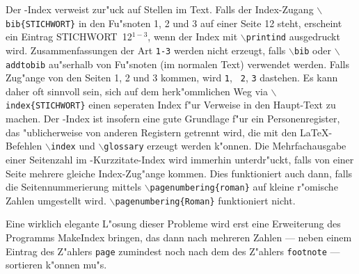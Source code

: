 \documentclass[11pt]{article}                    %
\def\Befehl#1{{\tt$\backslash$#1}}
\begin{document}
  Der \bibarts-Index verweist zur"uck auf Stellen im Text. Falls der
  Index-Zugang \Befehl{bib\{STICHWORT\}} in den Fu"snoten 1, 2 und 3 auf
  einer Seite 12 steht, erscheint ein Eintrag {\sf STICHWORT~12$^{1-3}$\/},
  wenn der Index mit \Befehl{printind} ausgedruckt wird. Zusammenfassungen
  der Art {\tt 1-3} werden nicht erzeugt, falls \Befehl{bib} oder
  \Befehl{addtobib} au"serhalb von Fu"snoten (im normalen Text) verwendet
  werden. Falls Zug"ange von den Seiten 1, 2 und 3 kommen, wird {\tt 1}, {\tt
  2}, {\tt 3} dastehen. Es kann daher oft sinnvoll sein, sich auf dem
  herk"ommlichen Weg via \Befehl{index\{STICHWORT\}} einen seperaten Index
  f"ur Verweise in den Haupt-Text zu machen. Der \bibarts-Index ist insofern
  eine gute Grundlage f"ur ein Personenregister, das "ublicherweise von
  anderen Registern getrennt wird, die mit den \LaTeX-Befehlen \Befehl{index}
  und \Befehl{glossary} erzeugt werden k"onnen. Die Mehrfachausgabe einer
  Seitenzahl im \bibarts-Kurzzitate-Index wird immerhin unterdr"uckt, falls
  von einer Seite mehrere gleiche Index-Zug"ange kommen. Dies funktioniert
  auch dann, falls die Seitennummerierung mittels
  \Befehl{pagenumbering\{roman\}} auf kleine r"omische Zahlen umgestellt
  wird. \Befehl{pagenumbering\{Roman\}} funktioniert nicht.

  Eine wirklich elegante L"osung dieser Probleme wird erst eine Erweiterung
  des Programms {\sc MakeIndex} bringen, das dann nach mehreren Zahlen ---
  neben einem Eintrag des Z"ahlers {\tt page} zumindest noch nach dem des
  Z"ahlers {\tt footnote} --- sortieren k"onnen mu"s.

  \def\abstractname{Message}

  \vspace{3ex}
  \noindent\hrulefill
\end{document}
